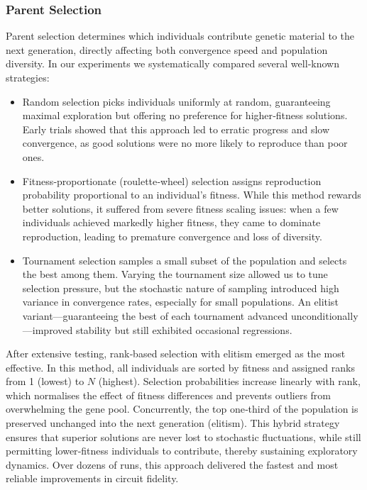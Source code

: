 \documentclass[11pt,a4paper]{article}
\begin{document}
\subsubsection*{Parent Selection}
Parent selection determines which individuals contribute genetic material to the next generation, directly affecting both convergence speed and population diversity. In our experiments we systematically compared several well‐known strategies:

\begin{itemize}
    \item Random selection picks individuals uniformly at random, guaranteeing maximal exploration but offering no preference for higher‐fitness solutions. Early trials showed that this approach led to erratic progress and slow convergence, as good solutions were no more likely to reproduce than poor ones.

    \item Fitness‐proportionate (roulette‐wheel) selection assigns reproduction probability proportional to an individual’s fitness. While this method rewards better solutions, it suffered from severe fitness scaling issues: when a few individuals achieved markedly higher fitness, they came to dominate reproduction, leading to premature convergence and loss of diversity.

    \item Tournament selection samples a small subset of the population and selects the best among them. Varying the tournament size allowed us to tune selection pressure, but the stochastic nature of sampling introduced high variance in convergence rates, especially for small populations. An elitist variant—guaranteeing the best of each tournament advanced unconditionally—improved stability but still exhibited occasional regressions.
\end{itemize}

After extensive testing, rank‐based selection with elitism emerged as the most effective. In this method, all individuals are sorted by fitness and assigned ranks from 1 (lowest) to $N$ (highest). Selection probabilities increase linearly with rank, which normalises the effect of fitness differences and prevents outliers from overwhelming the gene pool. Concurrently, the top one‐third of the population is preserved unchanged into the next generation (elitism). This hybrid strategy ensures that superior solutions are never lost to stochastic fluctuations, while still permitting lower‐fitness individuals to contribute, thereby sustaining exploratory dynamics. Over dozens of runs, this approach delivered the fastest and most reliable improvements in circuit fidelity.
\end{document}
